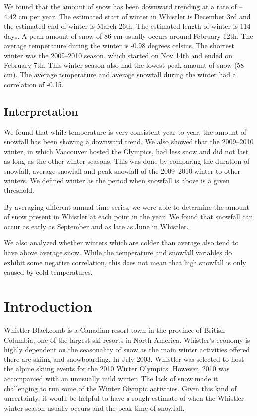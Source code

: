 \documentclass[12pt,twoside]{article}
\begin{document}
{We found that the amount of snow has been downward trending at a rate of -- 4.42 cm per year. The estimated start of winter in Whistler is December 3rd and the estimated end of winter is March 26th. The estimated length of winter is 114 days. A peak amount of snow of 86 cm usually occurs around February 12th. The average temperature during the winter is -0.98 degrees celsius. The shortest winter was the 2009--2010 season, which started on Nov 14th and ended on February 7th. This winter season also had the lowest peak amount of snow (58 cm). The average temperature and average snowfall during the winter had a correlation of -0.15.

\subsection{Interpretation}

We found that while temperature is very consistent year to year, the amount of snowfall has been showing a downward trend. We also showed that the 2009--2010 winter, in which Vancouver hosted the Olympics, had less snow and did not last as long as the other winter seasons. This was done by comparing the duration of snowfall, average snowfall and peak snowfall of the 2009--2010 winter to other winters. We defined winter as the period when snowfall is above is a given threshold.

By averaging different annual time series, we were able to determine the amount of snow present in Whistler at each point in the year. We found that snowfall can occur as early as September and as late as June in Whistler.

We also analyzed whether winters which are colder than average also tend to have above average snow. While the temperature and snowfall variables do exhibit some negative correlation, this does not mean that high snowfall is only caused by cold temperatures.

\section{Introduction}

Whistler Blackcomb is a Canadian resort town in the province of British Columbia, one of the largest ski resorts in North America. Whistler’s economy is highly dependent on the seasonality of snow as the main winter activities offered there are skiing and snowboarding. In July 2003, Whistler was selected to host the alpine skiing events for the 2010 Winter Olympics. However, 2010 was accompanied with an unusually mild winter. The lack of snow made it challenging to run some of the Winter Olympic activities. Given this kind of uncertainty, it would be helpful to have a rough estimate of when the Whistler winter season usually occurs and the peak time of snowfall.

}
\end{document}
